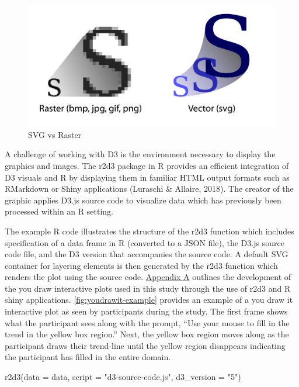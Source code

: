 \documentclass[print]{nuthesis}
\newenvironment{Shaded}{\begin{snugshade}}{\end{snugshade}}
\newcommand{\AttributeTok}[1]{\textcolor[rgb]{0.77,0.63,0.00}{#1}}
\newcommand{\FunctionTok}[1]{\textcolor[rgb]{0.00,0.00,0.00}{#1}}
\newcommand{\NormalTok}[1]{#1}
\newcommand{\StringTok}[1]{\textcolor[rgb]{0.31,0.60,0.02}{#1}}
\begin{document}
\begin{figure}[tbp]

{\centering \includegraphics[width=0.7\linewidth,]{images/raster-vs-vector} 

}

\caption{SVG vs Raster}\label{fig:raster-vs-vector}
\end{figure}

A challenge of working with D3 is the environment necessary to display the graphics and images.
The r2d3 package in R provides an efficient integration of D3 visuals and R by displaying them in familiar HTML output formats such as RMarkdown or Shiny applications (Luraschi \& Allaire, 2018).
The creator of the graphic applies D3.js source code to visualize data which has previously been processed within an R setting.

The example R code illustrates the structure of the r2d3 function which includes specification of a data frame in R (converted to a JSON file), the D3.js source code file, and the D3 version that accompanies the source code.
A default SVG container for layering elements is then generated by the r2d3 function which renders the plot using the source code.
\protect\hyperlink{youdrawit-with-shiny}{Appendix A} outlines the development of the you draw interactive plots used in this study through the use of r2d3 and R shiny applications.
\cref{fig:youdrawit-example} provides an example of a you draw it interactive plot as seen by participants during the study.
The first frame shows what the participant sees along with the prompt, ``Use your mouse to fill in the trend in the yellow box region.''
Next, the yellow box region moves along as the participant draws their trend-line until the yellow region disappears indicating the participant has filled in the entire domain.

\begin{Shaded}
\begin{Highlighting}[]
\FunctionTok{r2d3}\NormalTok{(}\AttributeTok{data =}\NormalTok{ data, }\AttributeTok{script =} \StringTok{"d3{-}source{-}code.js"}\NormalTok{, }
    \AttributeTok{d3\_version =} \StringTok{"5"}\NormalTok{)}
\end{Highlighting}
\end{Shaded}
\end{document}
